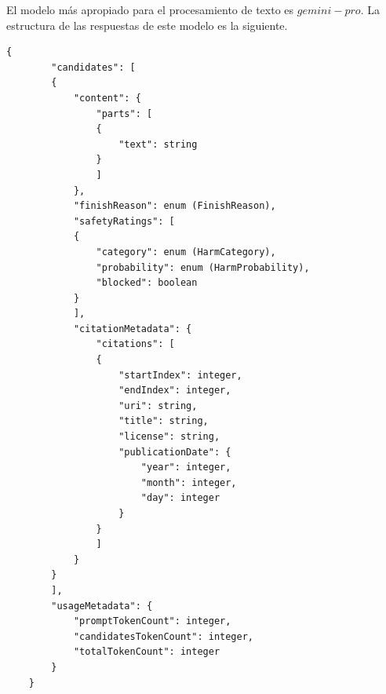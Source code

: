El modelo más apropiado para el procesamiento de texto es $gemini-pro$. La estructura de las respuestas de este modelo es la siguiente. 

\begin{lstlisting}[style=SpyderStyle, caption={Estructura de una respuesta de Gemini}, captionpos=b, label={lst:python},breaklines = true]
	{
		"candidates": [
		{
			"content": {
				"parts": [
				{
					"text": string
				}
				]
			},
			"finishReason": enum (FinishReason),
			"safetyRatings": [
			{
				"category": enum (HarmCategory),
				"probability": enum (HarmProbability),
				"blocked": boolean
			}
			],
			"citationMetadata": {
				"citations": [
				{
					"startIndex": integer,
					"endIndex": integer,
					"uri": string,
					"title": string,
					"license": string,
					"publicationDate": {
						"year": integer,
						"month": integer,
						"day": integer
					}
				}
				]
			}
		}
		],
		"usageMetadata": {
			"promptTokenCount": integer,
			"candidatesTokenCount": integer,
			"totalTokenCount": integer
		}
	}
\end{lstlisting}

